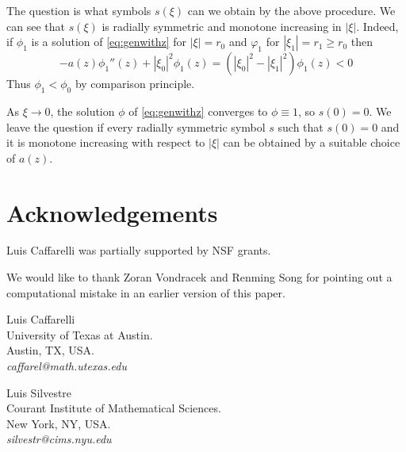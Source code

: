 \documentclass[letterpaper]{article}
\numberwithin{equation}{section}
\newcommand{\abs}[1]{\left\vert#1\right\vert}
\begin{document}
The question is what symbols $s(\xi)$ can we obtain by the above procedure. We can see that $s(\xi)$ is radially symmetric and monotone increasing in $\abs{\xi}$. Indeed, if $\phi_1$ is a solution of \eqref{eq:genwithz} for $\abs{\xi} = r_0$ and $\varphi_1$ for $\abs{\xi_1} = r_1 \geq r_0$ then 
\[-a(z) \phi_1''(z) + \abs{\xi_0}^2 \phi_1(z) = (\abs{\xi_0}^2 - \abs{\xi_1}^2) \phi_1(z) < 0 \]
Thus $\phi_1 < \phi_0$ by comparison principle.

As $\xi \to 0$, the solution $\phi$ of \eqref{eq:genwithz} converges to $\phi \equiv 1$, so $s(0)=0$. We leave the question if every radially symmetric symbol $s$ such that $s(0)=0$ and it is monotone increasing with respect to $\abs{\xi}$ can be obtained by a suitable choice of $a(z)$.

\section*{Acknowledgements}

Luis Caffarelli was partially supported by NSF grants.

We would like to thank Zoran Vondracek and Renming Song for pointing out a computational mistake in an earlier version of this paper.



\medskip

\noindent Luis Caffarelli \\ 
University of Texas at Austin. \\ 
Austin, TX, USA.\\
\emph{caffarel@math.utexas.edu}

\medskip

\noindent Luis Silvestre \\ 
Courant Institute of Mathematical Sciences. \\ 
New York, NY, USA.\\
\emph{silvestr@cims.nyu.edu}
\end{document}
